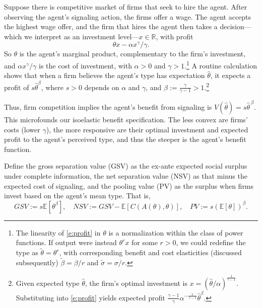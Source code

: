 \documentclass[12 pt]{article}
\theoremstyle{remark}
\theoremstyle{definition}
\newcommand{\E}{\mathbb{E}}
\def\Reals{\mathbb R}
\let\oldfootnote\footnote
\renewcommand\footnote[1]{\oldfootnote{\hspace{.5mm}#1}}
\begin{document}
Suppose there is competitive market of firms that seek to hire the agent. After observing the agent's signaling action, the firms offer a wage. The agent accepts the highest wage offer, and the firm that hires the agent then takes a decision---which we interpret as an investment level---$x\in \Reals$, with profit
\begin{equation}
\label{e:profit}
\theta x - \alpha x^\gamma/\gamma.
\end{equation}
So $\theta$ is the agent's marginal product, complementary to the firm's investment, and $\alpha x^\gamma/\gamma$ is the cost of investment, with $\alpha>0$ and $\gamma > 1$.\footnote{%
%
The linearity of \eqref{e:profit} in $\theta$ is a normalization within the class of power functions. If output were instead $\theta^r x$ for some $r > 0$, we could redefine the type as $\tilde\theta = \theta^r$, with corresponding benefit and cost elasticities (discussed subsequently) $\tilde \beta = \beta / r$ and $\tilde \sigma = \sigma/r$.}
A routine calculation shows that when a firm believes the agent's type has expectation $\hat \theta$, it expects a profit of $s \hat \theta^\beta$, where $s>0$ depends on $\alpha$ and $\gamma$, and $\beta:=\frac{\gamma}{\gamma-1}>1$.\footnote{Given expected type $\hat \theta$, the firm's optimal investment is $x=(\hat \theta/\alpha)^{\frac{1}{\gamma -1}}$. Substituting into \eqref{e:profit} yields expected profit $\frac{\gamma -1}{\gamma}\alpha^{-\frac{1}{\gamma-1}} \hat \theta^\beta$.}
 
Thus, firm competition implies the agent's benefit from signaling is $V(\hat\theta) = s \hat\theta^{\,\beta}$. This microfounds our isoelastic benefit specification. The less convex are firms' costs (lower $\gamma$), the more responsive are their optimal investment and expected profit to the agent's perceived type, and thus the steeper is the agent's benefit function.

Define the {gross separation value} (GSV) as the ex-ante expected social surplus under complete information, the {net separation value} (NSV) as that minus the expected cost of signaling, and the {pooling value} (PV) as the surplus when firms invest based on the agent's mean type. That is,
$$GSV:=s \E[\theta^\beta], \quad NSV:=GSV-\E[C(A(\theta),\theta)], \quad PV:= s (\E[\theta])^\beta.$$
\end{document}

